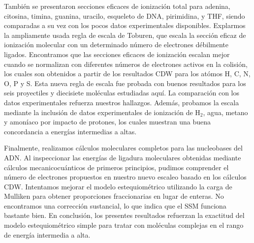 También se presentaron secciones eficaces de ionización total
para adenina, citosina, timina, guanina, uracilo, esqueleto de DNA, 
pirimidina, y THF, siendo comparadas a su vez con los pocos datos
experimentales disponibles. Explarmos la ampliamente usada regla de 
escala de Toburen, que escala la sección eficaz de ionización molecular 
con un determinado número de electrones débilmente ligados.
Encontramos que las secciones eficaces de ionización escalan
mejor cuando se normalizan con diferentes números de electrones activos
en la colisión, los cuales son obtenidos a partir de los resultados CDW
para los atómos H, C, N, O, P y S. Esta nueva regla de escala fue 
probada con buenos resultados para los seis proyectiles y diecisiete 
moléculas estudiadas aquí. La comparación con los datos experimentales 
refuerza nuestros hallazgos. Además, probamos la escala mediante la 
inclusión de datos experimentales de ionización de H$_2$, agua, metano 
y amoníaco por impacto de protones, los cuales muestran una buena 
concordancia a energías intermedias a altas.

Finalmente, realizamos cálculos moleculares completos para las 
nucleobases del ADN. Al inspeccionar las energías de ligadura 
moleculares obtenidas mediante cálculos mecanicocuánticos de primeros 
principios, pudimos comprender el número de electrones propuestos en 
nuestro nuevo escaleo basado en los cálculos CDW. Intentamos mejorar el 
modelo estequiométrico utilizando la carga de Mulliken para obtener 
proporciones fraccionarias en lugar de enteras. No encontramos una 
corrección sustancial, lo que indica que el SSM funciona bastante bien. 
En conclusión, los presentes resultados refuerzan la exactitud del modelo
estequiométrico simple para tratar con moléculas complejas en el rango 
de energía intermedia a alta. 



